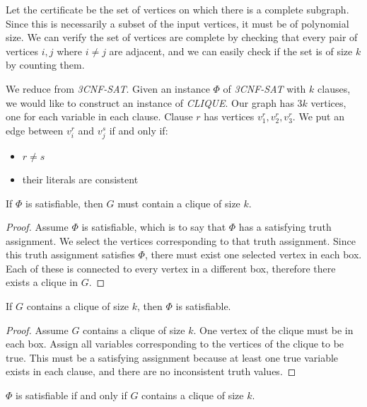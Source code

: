 Let the certificate be the set of vertices on which there is a
complete subgraph.  Since this is necessarily a subset of the input
vertices, it must be of polynomial size.  We can verify the set of
vertices are complete by checking that every pair of vertices $i,j$
where $i \neq j$ are adjacent, and we can easily check if the set is
of size $k$ by counting them.

We reduce from \emph{3CNF-SAT}.  Given an instance $\Phi$ of \emph{3CNF-SAT}
with $k$ clauses, we would like to construct an instance of
\emph{CLIQUE}.  Our graph has $3k$ vertices, one for each variable in
each clause.  Clause $r$ has vertices $v^r_1,v^r_2,v^r_3$.  We put an
edge between $v^r_i$ and $v^s_j$ if and only if:

\begin{itemize}
\item $r \neq s$
\item their literals are consistent
\end{itemize}

\begin{lemma}
  If $\Phi$ is satisfiable, then $G$ must contain a clique of size $k$.
\end{lemma}

\begin{proof}
  Assume $\Phi$ is satisfiable, which is to say that $\Phi$ has a
  satisfying truth assignment.  We select the vertices corresponding
  to that truth assignment.  Since this truth assignment satisfies
  $\Phi$, there must exist one selected vertex in each box.  Each of
  these is connected to every vertex in a different box, therefore
  there exists a clique in $G$.
\end{proof}

\begin{lemma}
  If $G$ contains a clique of size $k$, then $\Phi$ is satisfiable.
\end{lemma}

\begin{proof}
  Assume $G$ contains a clique of size $k$.  One vertex of the clique
  must be in each box.  Assign all variables corresponding to the
  vertices of the clique to be true.  This must be a satisfying
  assignment because at least one true variable exists in each clause,
  and there are no inconsistent truth values.
\end{proof}

\begin{theorem}
  $\Phi$ is satisfiable if and only if $G$ contains a clique of size $k$.
\end{theorem}

